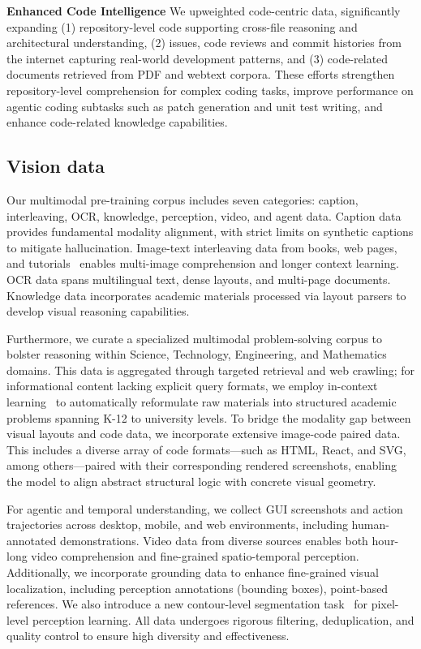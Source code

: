 \textbf{Enhanced Code Intelligence}
We upweighted code-centric data, significantly expanding (1) repository-level code supporting cross-file reasoning and architectural understanding, (2) issues, code reviews and commit histories from the internet capturing real-world development patterns, and (3) code-related documents retrieved from PDF and webtext corpora. These efforts strengthen repository-level comprehension for complex coding tasks, improve performance on agentic coding subtasks such as patch generation and unit test writing, and enhance code-related knowledge capabilities.

\subsection{Vision data}
Our multimodal pre-training corpus includes seven categories: caption, interleaving, OCR, knowledge, perception, video, and agent data. Caption data~\citep{schuhmann2022laion, gadre2024datacomp} provides fundamental modality alignment, with strict limits on synthetic captions to mitigate hallucination. Image-text interleaving data from books, web pages, and tutorials~\citep{zhu2024multimodal,laurenccon2024obelics} enables multi-image comprehension and longer context learning. OCR data spans multilingual text, dense layouts, and multi-page documents. Knowledge data incorporates academic materials processed via layout parsers to develop visual reasoning capabilities.

Furthermore, we curate a specialized multimodal problem-solving corpus to bolster reasoning within Science, Technology, Engineering, and Mathematics domains. This data is aggregated through targeted retrieval and web crawling; for informational content lacking explicit query formats, we employ in-context learning~\citep{brown2020languagemodelsfewshotlearners} to automatically reformulate raw materials into structured academic problems spanning K-12 to university levels. To bridge the modality gap between visual layouts and code data, we incorporate extensive image-code paired data. This includes a diverse array of code formats—such as HTML, React, and SVG, among others—paired with their corresponding rendered screenshots, enabling the model to align abstract structural logic with concrete visual geometry.


For agentic and temporal understanding, we collect GUI screenshots and action trajectories across desktop, mobile, and web environments, including human-annotated demonstrations. Video data from diverse sources enables both hour-long video comprehension and fine-grained spatio-temporal perception. Additionally, we incorporate grounding data to enhance fine-grained visual localization, including perception annotations (bounding boxes), point-based references. We also introduce a new contour-level segmentation task~\citep{song2026pixellevelvlmperceptionsimple} for pixel-level perception learning. All data undergoes rigorous filtering, deduplication, and quality control to ensure high diversity and effectiveness.


